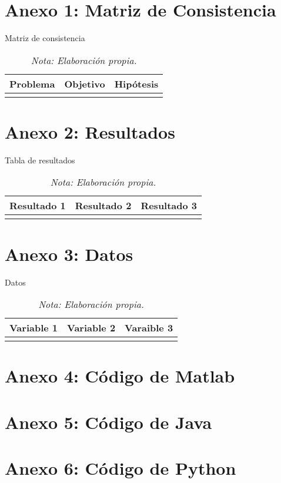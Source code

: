 	\annex 
		\chapter{Anexo 1: Matriz de Consistencia}
			\begin{table}[h!]
				\centering
				\caption{Matriz de consistencia}
				\begin{tabular}{p{5cm}p{5cm}p{5cm}}
					\toprule
					Problema & Objetivo & Hipótesis\\
					\midrule
					\lipsum[2] & \lipsum[2] & \lipsum[2]\\
					\bottomrule
				\end{tabular}
				\vspace{2mm}
				\caption*{\it Nota: Elaboración propia.}
				\label{tab: Matriz de consistencia}
			\end{table}
		\chapter{Anexo 2: Resultados}
			\begin{table}[h!]
				\centering
				\caption{Tabla de resultados}
				\begin{tabular}{p{5cm}p{5cm}p{5cm}}
					\toprule
					Resultado 1 & Resultado 2 & Resultado 3\\
					\midrule
					\lipsum[2] & \lipsum[2] & \lipsum[2]\\
					\bottomrule
				\end{tabular}
				\vspace{2mm}
				\caption*{\it Nota: Elaboración propia.}
				\label{tab: Resultados}
			\end{table}
		\chapter{Anexo 3: Datos}
			\begin{table}[h!]
				\centering
				\caption{Datos}
				\begin{tabular}{p{5cm}p{5cm}p{5cm}}
					\toprule
					Variable 1 & Variable 2 & Varaible 3\\
					\midrule
					\lipsum[2] & \lipsum[2] & \lipsum[2]\\
					\bottomrule
				\end{tabular}
				\vspace{2mm}
				\caption*{\it Nota: Elaboración propia.}
				\label{tab: Datos}
			\end{table}
		\chapter{Anexo 4: Código de Matlab}
			
		\chapter{Anexo 5: Código de Java}
			
		\chapter{Anexo 6: Código de Python}
			
		
		
		